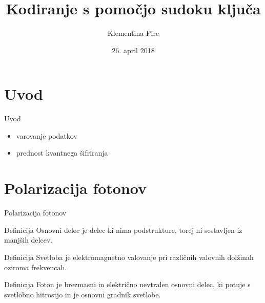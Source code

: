 \documentclass{beamer}
\title{Kodiranje s pomočjo sudoku ključa}
\author{Klementina Pirc}
\institute{Fakulteta za matematiko in fiziko \\ Oddelek za matematiko}
\date{26. april 2018}
\begin{document}

\begin{frame}
\titlepage
\end{frame}


\section{Uvod}


\begin{frame}{Uvod}
\begin{itemize}
\item varovanje podatkov
\item prednost kvantnega šifriranja
\end{itemize}
\end{frame}


\section{Polarizacija fotonov}


\begin{frame}{Polarizacija fotonov}

\begin{block}{Definicija}
Osnovni delec je delec ki nima podstrukture, torej ni sestavljen iz manjših delcev.
\end{block}

\begin{block}{Definicija}
Svetloba je elektromagnetno valovanje pri različnih valovnih dolžinah oziroma frekvencah.
\end{block}

\begin{block}{Definicija}
Foton je brezmasni in električno nevtralen osnovni delec, ki potuje s svetlobno hitrostjo in je osnovni gradnik svetlobe.
\end{block} 

\end{frame}

\end{document}
